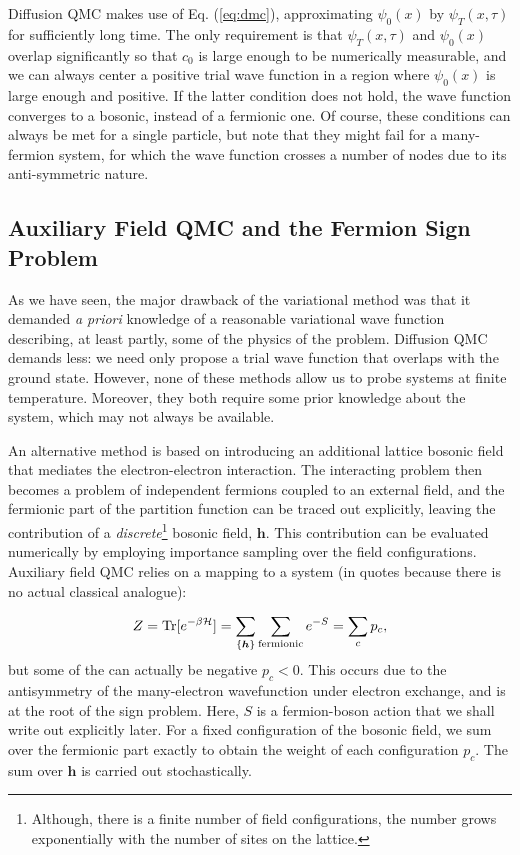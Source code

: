 Diffusion \ac{QMC} makes use of Eq. (\ref{eq:dmc}), approximating $\psi_0(x)$ by $\psi_T (x, \tau)$ for sufficiently long time.
The only requirement is that $\psi_T (x, \tau)$ and $\psi_0(x)$ overlap significantly so that $c_0$ is large enough to be numerically measurable, and we can always center a positive trial wave function in a region where $\psi_0(x)$ is large enough and positive.
If the latter condition does not hold, the wave function converges to a bosonic, instead of a fermionic one.
Of course, these conditions can always be met for a single particle, but note that they might fail for a many-fermion system, for which the wave function crosses a number of nodes due to its anti-symmetric nature.

\subsection{Auxiliary Field \acs{QMC} and the Fermion Sign Problem}
\label{subsec:introAFQMC}

As we have seen, the major drawback of the variational method was that it demanded \emph{a priori} knowledge of a reasonable variational wave function describing, at least partly, some of the physics of the problem.
Diffusion \acs{QMC} demands less: we need only propose a trial wave function that overlaps with the ground state.
However, none of these methods allow us to probe systems at finite temperature.
Moreover, they both require some prior knowledge about the system, which may not always be available.

An alternative method is based on introducing an additional lattice bosonic field that mediates the electron-electron interaction.
The interacting problem then becomes a problem of independent fermions coupled to an external field, and the fermionic part of the partition function can be traced out explicitly, leaving the contribution of a \emph{discrete}\footnote{Although, there is a finite number of field configurations, the number grows exponentially with the number of sites on the lattice.} bosonic field, $\bm h$.
This contribution can be evaluated numerically by employing importance sampling over the field configurations.
Auxiliary field \acs{QMC} relies on a mapping to a  system (in quotes because there is no actual classical analogue):

\begin{equation}
Z = \operatorname{Tr} [ e^{-\beta \mathcal{H} } ] = \sum_{\{ \bm h\} } \sum_{\text{fermionic}} e^{-S} = \sum_c p_c ,
\end{equation}
but some of the  can actually be negative $p_c < 0$.
This occurs due to the antisymmetry of the many-electron wavefunction under electron exchange, and is at the root of the sign problem.
Here, $S$ is a fermion-boson action that we shall write out explicitly later.
For a fixed configuration of the bosonic field, we sum over the fermionic part exactly to obtain the weight of each configuration $p_c$.
The sum over $\bm h$ is carried out stochastically.

